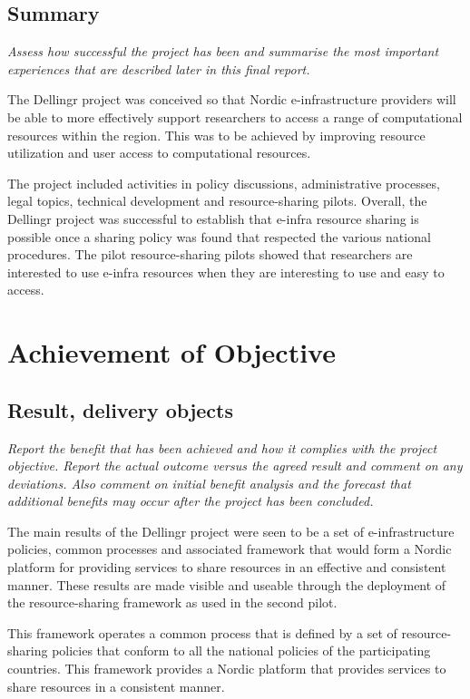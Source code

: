 \documentclass{article}
\newcommand{\dell}{Dellingr\xspace}
\begin{document}
\subsection{Summary}
{\it Assess how successful the project has been and summarise the most important experiences that are described later in this final report.}

The \dell project was conceived so that Nordic e-infrastructure providers will be able to more effectively support researchers to access a range of computational resources within the region.
This was to be achieved by improving resource utilization and user access to computational resources.

The project included activities in policy discussions, administrative processes, legal topics, technical development and resource-sharing pilots.
Overall, the \dell project was successful to establish that e-infra resource sharing is possible once a sharing policy was found that
respected the various national procedures.
The pilot resource-sharing pilots showed that researchers are interested to use e-infra resources when they are interesting to use and easy to access.


\section{Achievement of Objective}

\subsection{Result, delivery objects}
{\it Report the benefit that has been achieved and how it complies with the project objective.
Report the actual outcome versus the agreed result and comment on any deviations. Also comment on initial benefit analysis and the forecast that additional benefits may occur after the project has been concluded.}

The main results of the \dell project were seen to be a set of e-infrastructure policies, common processes and associated framework that would form a Nordic platform for providing services to share resources in an effective and consistent manner.
These results are made visible and useable through the deployment of the resource-sharing framework as used in the second pilot.

This framework operates a common process that is defined by a set of resource-sharing policies
that conform to all the national policies of the participating countries.
This framework provides a Nordic platform that provides services to share resources
in a consistent manner.
\end{document}
